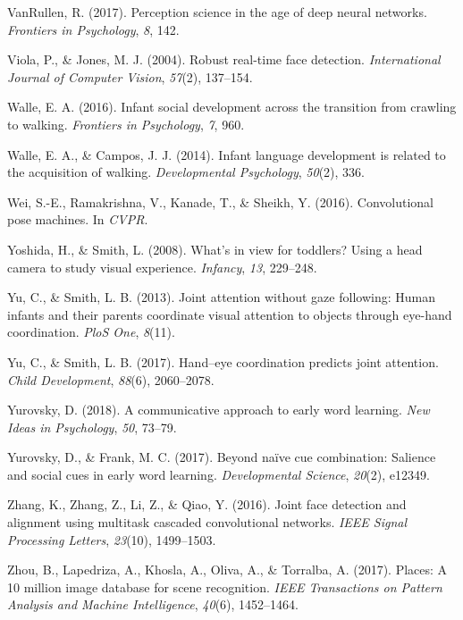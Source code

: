 \documentclass[english,man]{apa6}
\begin{document}
\hypertarget{ref-vanrullen2017perception}{}
VanRullen, R. (2017). Perception science in the age of deep neural
networks. \emph{Frontiers in Psychology}, \emph{8}, 142.

\hypertarget{ref-viola2004robust}{}
Viola, P., \& Jones, M. J. (2004). Robust real-time face detection.
\emph{International Journal of Computer Vision}, \emph{57}(2), 137--154.

\hypertarget{ref-walle2016infant}{}
Walle, E. A. (2016). Infant social development across the transition
from crawling to walking. \emph{Frontiers in Psychology}, \emph{7}, 960.

\hypertarget{ref-walle2014}{}
Walle, E. A., \& Campos, J. J. (2014). Infant language development is
related to the acquisition of walking. \emph{Developmental Psychology},
\emph{50}(2), 336.

\hypertarget{ref-wei2016cpm}{}
Wei, S.-E., Ramakrishna, V., Kanade, T., \& Sheikh, Y. (2016).
Convolutional pose machines. In \emph{CVPR}.

\hypertarget{ref-yoshida2008}{}
Yoshida, H., \& Smith, L. (2008). What's in view for toddlers? Using a
head camera to study visual experience. \emph{Infancy}, \emph{13},
229--248.

\hypertarget{ref-yu2013joint}{}
Yu, C., \& Smith, L. B. (2013). Joint attention without gaze following:
Human infants and their parents coordinate visual attention to objects
through eye-hand coordination. \emph{PloS One}, \emph{8}(11).

\hypertarget{ref-yu2017hand}{}
Yu, C., \& Smith, L. B. (2017). Hand--eye coordination predicts joint
attention. \emph{Child Development}, \emph{88}(6), 2060--2078.

\hypertarget{ref-yurovsky2018communicative}{}
Yurovsky, D. (2018). A communicative approach to early word learning.
\emph{New Ideas in Psychology}, \emph{50}, 73--79.

\hypertarget{ref-yurovsky2017beyond}{}
Yurovsky, D., \& Frank, M. C. (2017). Beyond naïve cue combination:
Salience and social cues in early word learning. \emph{Developmental
Science}, \emph{20}(2), e12349.

\hypertarget{ref-zhang2016}{}
Zhang, K., Zhang, Z., Li, Z., \& Qiao, Y. (2016). Joint face detection
and alignment using multitask cascaded convolutional networks.
\emph{IEEE Signal Processing Letters}, \emph{23}(10), 1499--1503.

\hypertarget{ref-zhou2017places}{}
Zhou, B., Lapedriza, A., Khosla, A., Oliva, A., \& Torralba, A. (2017).
Places: A 10 million image database for scene recognition. \emph{IEEE
Transactions on Pattern Analysis and Machine Intelligence},
\emph{40}(6), 1452--1464.

\endgroup
\end{document}
